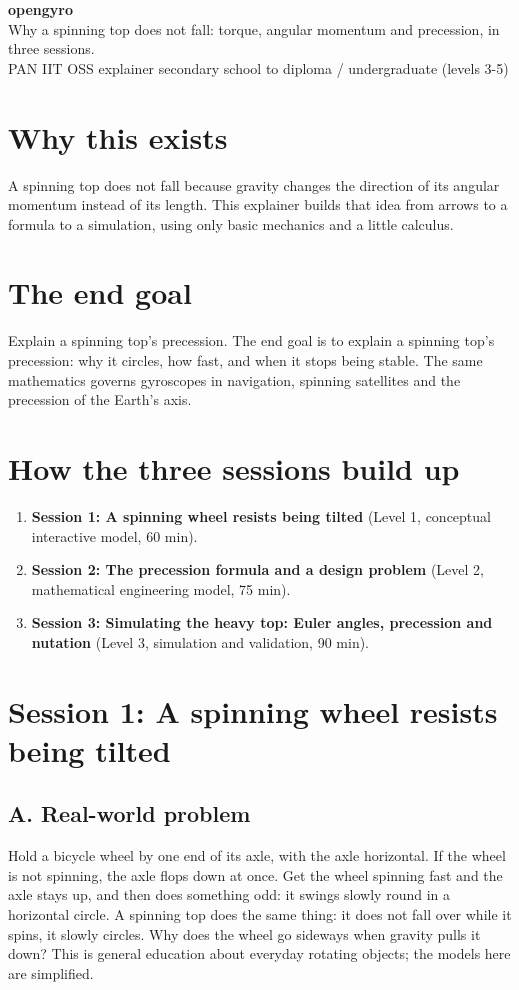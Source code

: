 \documentclass[11pt,a4paper]{article}
\begin{document}
\begin{center}{\LARGE\bfseries opengyro}\\[0.4em]{\large Why a spinning top does not fall: torque, angular momentum and precession, in three sessions.}\\[0.2em]\small PAN IIT OSS explainer \textbullet{} secondary school to diploma / undergraduate (levels 3-5)\end{center}

\section*{Why this exists}
A spinning top does not fall because gravity changes the direction of its angular momentum instead of its length. This explainer builds that idea from arrows to a formula to a simulation, using only basic mechanics and a little calculus.

\section*{The end goal}
Explain a spinning top's precession. The end goal is to explain a spinning top's precession: why it circles, how fast, and when it stops being stable. The same mathematics governs gyroscopes in navigation, spinning satellites and the precession of the Earth's axis.

\section*{How the three sessions build up}
\begin{enumerate}[nosep]
\item \textbf{Session 1: A spinning wheel resists being tilted} (Level 1, conceptual interactive model, 60 min).
\item \textbf{Session 2: The precession formula and a design problem} (Level 2, mathematical engineering model, 75 min).
\item \textbf{Session 3: Simulating the heavy top: Euler angles, precession and nutation} (Level 3, simulation and validation, 90 min).
\end{enumerate}

\section{Session 1: A spinning wheel resists being tilted}

\subsection*{A. Real-world problem}
Hold a bicycle wheel by one end of its axle, with the axle horizontal. If the wheel is not spinning, the axle flops down at once. Get the wheel spinning fast and the axle stays up, and then does something odd: it swings slowly round in a horizontal circle. A spinning top does the same thing: it does not fall over while it spins, it slowly circles. Why does the wheel go sideways when gravity pulls it down? This is general education about everyday rotating objects; the models here are simplified.
\end{document}
